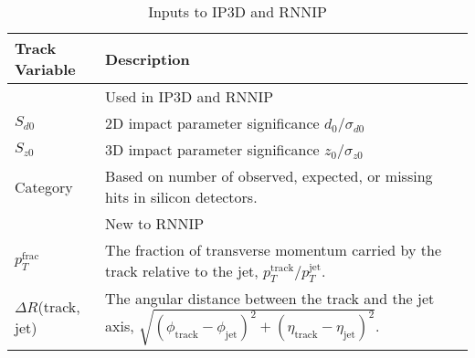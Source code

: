 \begin{table}[tbh]
   \begin{center}
        \caption{ Inputs to IP3D and RNNIP }
        \label{tab:rnnip}
        \footnotesize
        \begin{tabular}{p{}|p{}}
        \hline
        Track Variable & Description \\
        \hline
        \hline
        & Used in IP3D and RNNIP \\
        \hline
        $S_{d0}$ &  2D impact parameter significance $d_0 / \sigma_{d0}$ \\
        $S_{z0}$ &  3D impact parameter significance $z_0 /\sigma_{z0}$\\
        Category & Based on number of observed, expected, or missing hits in silicon detectors.\\
        \hline
        \hline
        & New to RNNIP \\
        \hline
        $p_T^{\textrm{frac}}$ & The fraction of transverse momentum carried by the track relative to the jet, $p_T^{\textrm{track}} / p_T^{\textrm{jet}}$. \\
        $\Delta R$(track, jet) & The angular distance between the track and the jet axis,
            $\sqrt{(\phi_{\textrm{track}} − \phi_{\textrm{jet}} )^2 + (\eta_{\textrm{track}} − \eta_{\textrm{jet}})^2}$.\\
        \hline
        \end{tabular}
    \end{center}
\end{table}
